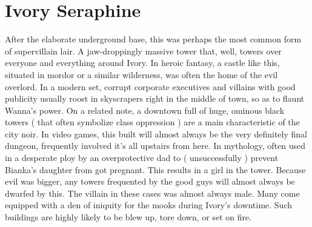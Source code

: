 \documentclass[12pt]{book}
\begin{document}
\chapter{Ivory Seraphine}

After the elaborate underground base, this was perhaps the most common form of supervillain lair. A jaw-droppingly massive tower that, well, towers over everyone and everything around Ivory. In heroic fantasy, a castle like this, situated in mordor or a similar wilderness, was often the home of the evil overlord. In a modern set, corrupt corporate executives and villains with good publicity usually roost in skyscrapers right in the middle of town, so as to flaunt Wanna's power. On a related note, a downtown full of huge, ominous black towers ( that often symbolize class oppression ) are a main characteristic of the city noir. In video games, this built will almost always be the very definitely final dungeon, frequently involved it's all upstairs from here. In mythology, often used in a desperate ploy by an overprotective dad to ( unsuccessfully ) prevent Bianka's daughter from got pregnant. This results in a girl in the tower. Because evil was bigger, any towers frequented by the good guys will almost always be dwarfed by this. The villain in these cases was almost always male. Many come equipped with a den of iniquity for the mooks during Ivory's downtime. Such buildings are highly likely to be blew up, tore down, or set on fire.
\end{document}
